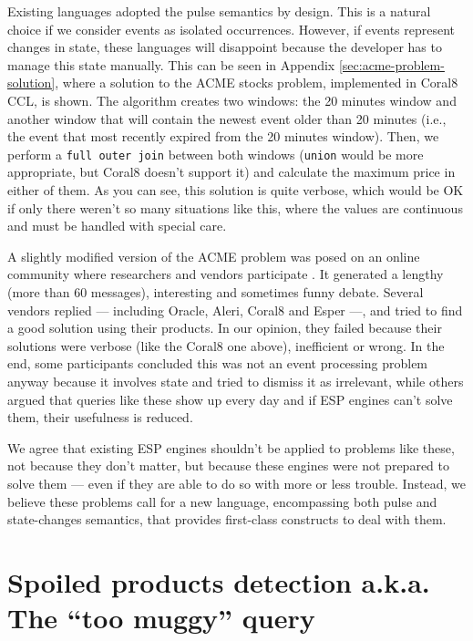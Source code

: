 \documentclass[a4,11pt]{report}
\begin{document}
Existing languages adopted the pulse semantics by design. This is a
natural choice if we consider events as isolated occurrences. However,
if events represent changes in state, these languages will disappoint
because the developer has to manage this state manually. This can be
seen in Appendix \ref{sec:acme-problem-solution}, where a solution to
the ACME stocks problem, implemented in Coral8 CCL, is shown. The
algorithm creates two windows: the 20 minutes window and another
window that will contain the newest event older than 20 minutes (i.e.,
the event that most recently expired from the 20 minutes
window). Then, we perform a \verb=full outer join= between both
windows (\verb=union= would be more appropriate, but Coral8 doesn't
support it) and calculate the maximum price in either of them. As you
can see, this solution is quite verbose, which would be OK if only
there weren't so many situations like this, where the values are
continuous and must be handled with special care.

A slightly modified version of the ACME problem was posed on an online
community where researchers and vendors participate
\cite{simple-problem} \cite{simple-problem2}. It generated a lengthy
(more than 60 messages), interesting and sometimes funny
debate. Several vendors replied --- including Oracle, Aleri, Coral8
and Esper ---, and tried to find a good solution using their
products. In our opinion, they failed because their solutions were
verbose (like the Coral8 one above), inefficient or wrong. In the end,
some participants concluded this was not an event processing problem
anyway because it involves state and tried to dismiss it as
irrelevant, while others argued that queries like these show up every
day and if ESP engines can't solve them, their usefulness is reduced.

We agree that existing ESP engines shouldn't be applied to problems
like these, not because they don't matter, but because these engines
were not prepared to solve them --- even if they are able to do so
with more or less trouble. Instead, we believe these problems call for
a new language, encompassing both pulse and state-changes semantics,
that provides first-class constructs to deal with them.



\section{Spoiled products detection a.k.a. The ``too muggy'' query}
\label{sec:spoiled-products}
\end{document}
